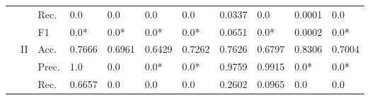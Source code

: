 \begin{tabular}{cclllllllll}
                                                                                                               &                                   & Rec.                                                 & 0.0                     & 0.0                     & 0.0                          & 0.0                     & 0.0337                                                                       & 0.0                                                                         & 0.0001                                    & 0.0                                       \\
                                                                                                               &                                   & F1                                                   & 0.0*                    & 0.0*                    & 0.0*                         & 0.0*                    & 0.0651                                                                       & 0.0*                                                                        & 0.0002                                    & 0.0*                                      \\ 
    \cmidrule{2-11}
                                                                                                               & \multirow{4}{*}{II}               & Acc.                                                 & 0.7666                  & 0.6961                  & 0.6429                       & 0.7262                  & 0.7626                                                                       & 0.6797                                                                      & 0.8306                                    & 0.7004                                    \\
                                                                                                               &                                   & Prec.                                                & 1.0                     & 0.0                     & 0.0*                         & 0.0*                    & 0.9759                                                                       & 0.9915                                                                      & 0.0*                                      & 0.0*                                      \\
                                                                                                               &                                   & Rec.                                                 & 0.6657                  & 0.0                     & 0.0                          & 0.0                     & 0.2602                                                                       & 0.0965                                                                      & 0.0                                       & 0.0                                       \\

\end{tabular}
